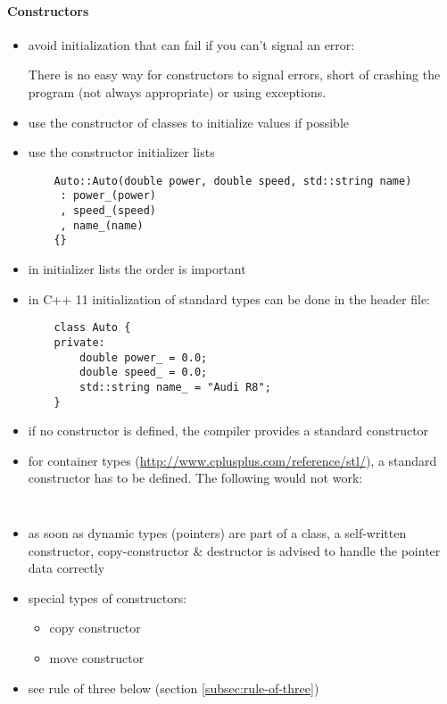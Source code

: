 \paragraph{Constructors}
\begin{itemize}

	\item avoid initialization that can fail if you can't signal an error:
	
	There is no easy way for constructors to signal errors, short of crashing the program (not always appropriate) or using exceptions.
	\item use the constructor of classes to initialize values if possible
	\item use the constructor initializer lists
	\begin{verbatim}
	Auto::Auto(double power, double speed, std::string name)
	 : power_(power)
	 , speed_(speed)
	 , name_(name)
	{}
	\end{verbatim}
	
	\item in initializer lists the order is important
	\item in C++ 11 initialization of standard types can be done in the header file:
	\begin{verbatim}
	class Auto {
	private:
		double power_ = 0.0;
		double speed_ = 0.0;
		std::string name_ = "Audi R8";
	}
	\end{verbatim}
	
	\item if no constructor is defined, the compiler provides a standard constructor
	\item for container types (\url{http://www.cplusplus.com/reference/stl/}), a standard constructor has to be defined. The following would not work:
	
	\begin{minipage}[t]{0.4\textwidth}
		\inputminted{cpp}{src/constructors/ex-1/main.cpp}
	\end{minipage}\hfill
	\begin{minipage}[t]{0.4\textwidth}
		\inputminted{cpp}{src/constructors/ex-1/ConstructorClass.h}
	\end{minipage}

	\item as soon as dynamic types (pointers) are part of a class, a self-written constructor, copy-constructor \& destructor is advised to handle the pointer data correctly

	\item special types of constructors:
	\begin{itemize}
		\item copy constructor
		\item move constructor
	\end{itemize}

	\item see rule of three below (section \ref{subsec:rule-of-three})
\end{itemize}

